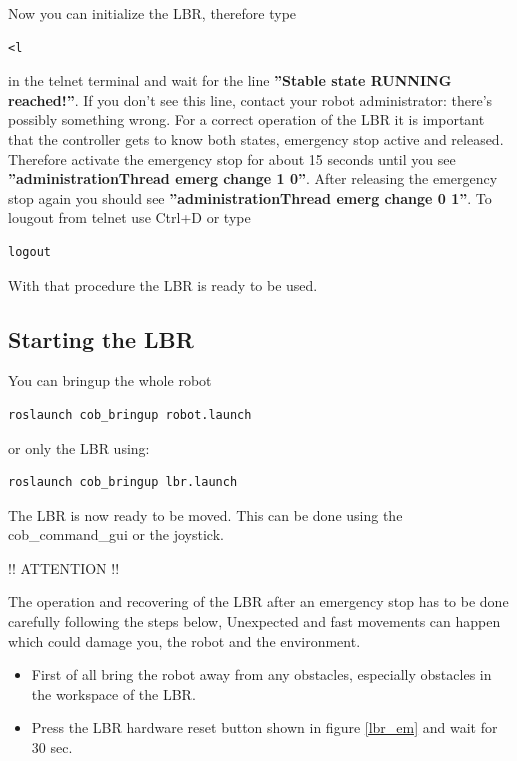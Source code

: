 Now you can initialize the LBR, therefore type
\begin{lstlisting}
<l
\end{lstlisting}

in the telnet terminal and wait for the line \textbf{”Stable state RUNNING reached!”}. If you don’t see this line, contact your robot administrator: there’s possibly something wrong.
For a correct operation of the LBR it is important that the controller gets to know both states, emergency stop active and released. Therefore activate the emergency stop for about 15 seconds until you see \textbf{”administrationThread
emerg change 1 0”}. After releasing the emergency stop again you should see \textbf{”administrationThread emerg change 0 1”}.
To lougout from telnet use Ctrl+D or type
\begin{lstlisting}
logout
\end{lstlisting}
With that procedure the LBR is ready to be used.

\subsection{Starting the LBR}

You can bringup the whole robot
\begin{lstlisting}
roslaunch cob_bringup robot.launch
\end{lstlisting}

or only the LBR using:
\begin{lstlisting}
roslaunch cob_bringup lbr.launch
\end{lstlisting}

The LBR is now ready to be moved. This can be done using the cob\_command\_gui or the joystick.

\begin{center}
\begin{LARGE}
!! ATTENTION !!
\end{LARGE}
\end{center}

The operation and recovering of the LBR after an emergency stop has to be done carefully following the steps below, Unexpected and fast movements can happen which could damage you, the robot and the environment.

\begin{itemize}
\item First of all bring the robot away from any obstacles, especially obstacles in the workspace of the LBR.
\item Press the LBR hardware reset button shown in figure \ref{lbr_em} and wait for 30 sec.
\end{itemize}

